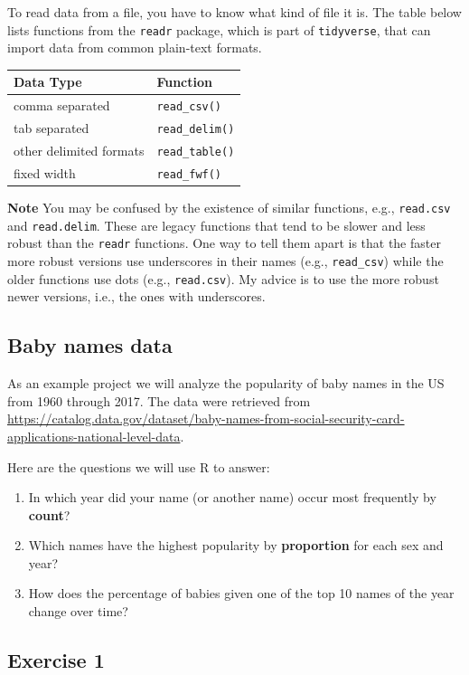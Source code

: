 \documentclass[]{book}
\providecommand{\tightlist}{%
  \setlength{\itemsep}{0pt}\setlength{\parskip}{0pt}}
\begin{document}
To read data from a file, you have to know what kind of file it is. The
table below lists functions from the \texttt{readr} package, which is
part of \texttt{tidyverse}, that can import data from common plain-text
formats.

\begin{longtable}[]{@{}ll@{}}
\toprule
Data Type & Function\tabularnewline
\midrule
\endhead
comma separated & \texttt{read\_csv()}\tabularnewline
tab separated & \texttt{read\_delim()}\tabularnewline
other delimited formats & \texttt{read\_table()}\tabularnewline
fixed width & \texttt{read\_fwf()}\tabularnewline
\bottomrule
\end{longtable}

\textbf{Note} You may be confused by the existence of similar functions,
e.g., \texttt{read.csv} and \texttt{read.delim}. These are legacy
functions that tend to be slower and less robust than the \texttt{readr}
functions. One way to tell them apart is that the faster more robust
versions use underscores in their names (e.g., \texttt{read\_csv}) while
the older functions use dots (e.g., \texttt{read.csv}). My advice is to
use the more robust newer versions, i.e., the ones with underscores.

\subsection{Baby names data}\label{baby-names-data}

As an example project we will analyze the popularity of baby names in
the US from 1960 through 2017. The data were retrieved from
\url{https://catalog.data.gov/dataset/baby-names-from-social-security-card-applications-national-level-data}.

Here are the questions we will use R to answer:

\begin{enumerate}
\def\labelenumi{\arabic{enumi}.}
\tightlist
\item
  In which year did your name (or another name) occur most frequently by
  \textbf{count}?
\item
  Which names have the highest popularity by \textbf{proportion} for
  each sex and year?
\item
  How does the percentage of babies given one of the top 10 names of the
  year change over time?
\end{enumerate}

\subsection{Exercise 1}\label{exercise-1}
\end{document}
